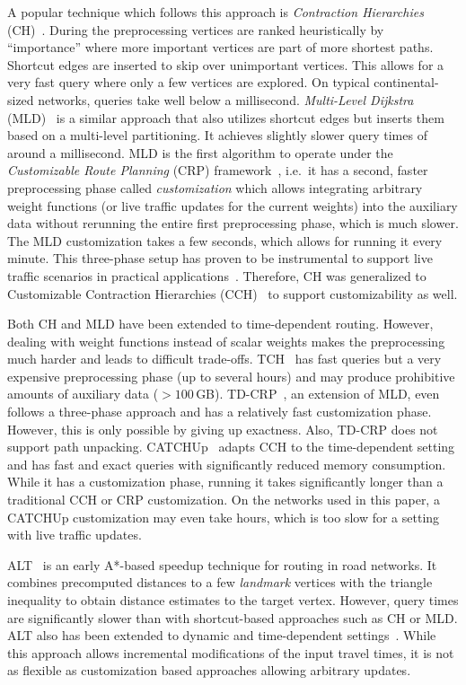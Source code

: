 \documentclass[a4paper,UKenglish,cleveref, autoref, thm-restate,anonymous]{lipics-v2021}
\begin{document}
A popular technique which follows this approach is \emph{Contraction Hierarchies} (CH)~\cite{gssv-erlrn-12}.
During the preprocessing vertices are ranked heuristically by ``importance'' where more important vertices are part of more shortest paths.
Shortcut edges are inserted to skip over unimportant vertices.
This allows for a very fast query where only a few vertices are explored.
On typical continental-sized networks, queries take well below a millisecond.
\emph{Multi-Level Dijkstra} (MLD)~\cite{swz-umlgt-02} is a similar approach that also utilizes shortcut edges but inserts them based on a multi-level partitioning.
It achieves slightly slower query times of around a millisecond.
MLD is the first algorithm to operate under the \emph{Customizable Route Planning} (CRP) framework~\cite{dgpw-crprn-13}, i.e.\ it has a second, faster preprocessing phase called \emph{customization} which allows integrating arbitrary weight functions (or live traffic updates for the current weights) into the auxiliary data without rerunning the entire first preprocessing phase, which is much slower.
The MLD customization takes a few seconds, which allows for running it every minute.
This three-phase setup has proven to be instrumental to support live traffic scenarios in practical applications~\cite{bingblog}.
Therefore, CH was generalized to Customizable Contraction Hierarchies (CCH)~\cite{dsw-cch-15} to support customizability as well.

Both CH and MLD have been extended to time-dependent routing.
However, dealing with weight functions instead of scalar weights makes the preprocessing much harder and leads to difficult trade-offs.
TCH~\cite{bgsv-mtdtt-13} has fast queries but a very expensive preprocessing phase (up to several hours) and may produce prohibitive amounts of auxiliary data ($> 100$\,GB).
TD-CRP~\cite{bdpw-dtdrp-16}, an extension of MLD, even follows a three-phase approach and has a relatively fast customization phase.
However, this is only possible by giving up exactness.
Also, TD-CRP does not support path unpacking.
CATCHUp~\cite{swz-sfert-21} adapts CCH to the time-dependent setting and has fast and exact queries with significantly reduced memory consumption.
While it has a customization phase, running it takes significantly longer than a traditional CCH or CRP customization.
On the networks used in this paper, a CATCHUp customization may even take hours, which is too slow for a setting with live traffic updates.

ALT~\cite{gh-cspas-05,gw-cppsp-05} is an early A*-based speedup technique for routing in road networks.
It combines precomputed distances to a few \emph{landmark} vertices with the triangle inequality to obtain distance estimates to the target vertex.
However, query times are significantly slower than with shortcut-based approaches such as CH or MLD.
ALT also has been extended to dynamic and time-dependent settings~\cite{dn-crdtd-12}. %
While this approach allows incremental modifications of the input travel times, it is not as flexible as customization based approaches allowing arbitrary updates.
\end{document}

